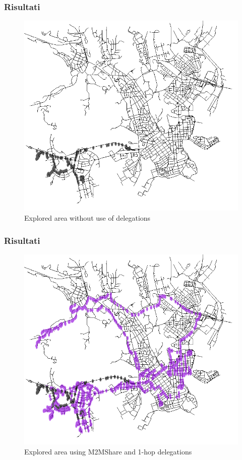 \documentclass{beamer}
\begin{document}
\begin{frame}
\frametitle{Risultati}
\begin{center}
\begin{figure}[ht]
\includegraphics[scale=0.25]{../figure/mappa_0_hop.png}
    \caption{Explored area without use of delegations}
\end{figure}
\end{center}
\end{frame}

\begin{frame}
\frametitle{Risultati}
\begin{center}
\begin{figure}[ht]
\includegraphics[scale=0.25]{../figure/mappa_1_hop.png}
    \caption{Explored area using M2MShare and 1-hop delegations}
\end{figure}
\end{center}
\end{frame}
\end{document}
